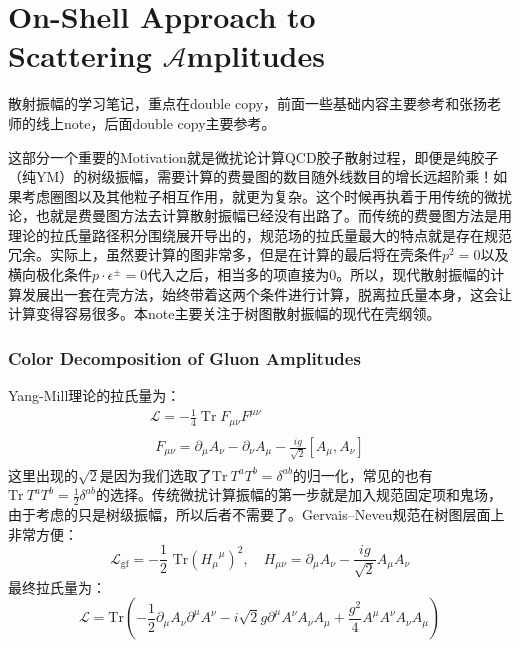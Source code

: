 \part{On-Shell Approach to \\
	Scattering $\mathcal{A}$mplitudes}
\setcounter{theorem}{0}
\setcounter{definition}{0}
\setcounter{lemma}{0}
\setcounter{sidenote}{1}

散射振幅的学习笔记，重点在double copy，前面一些基础内容主要参考\cite{Elvang:2015rqa}和张扬老师的线上note，后面double copy主要参考\cite{Carrasco:2015iwa,Bern:2019prr,Bern:2022wqg}。

这部分一个重要的Motivation就是微扰论计算QCD胶子散射过程，即便是纯胶子（纯YM）的树级振幅，需要计算的费曼图的数目随外线数目的增长远超阶乘！如果考虑圈图以及其他粒子相互作用，就更为复杂。这个时候再执着于用传统的微扰论，也就是费曼图方法去计算散射振幅已经没有出路了。而传统的费曼图方法是用理论的拉氏量路径积分围绕展开导出的，规范场的拉氏量最大的特点就是存在规范冗余。实际上，虽然要计算的图非常多，但是在计算的最后将在壳条件$p^2=0$以及横向极化条件$p\cdot\epsilon^{\pm}=0$代入之后，相当多的项直接为0。所以，现代散射振幅的计算发展出一套在壳方法，始终带着这两个条件进行计算，脱离拉氏量本身，这会让计算变得容易很多。本note主要关注于树图散射振幅的现代在壳纲领。
\section{Color Decomposition of Gluon Amplitudes}
Yang-Mill理论的拉氏量为：
\begin{equation}
	\begin{aligned}
		\mathcal{L}=-\frac14\operatorname{Tr}F_{\mu\nu}F^{\mu\nu}\\
		\begin{aligned}F_{\mu\nu}=\partial_{\mu}A_{\nu}-\partial_{\nu}A_{\mu}-\frac{ig}{\sqrt{2}}[A_{\mu},A_{\nu}]\end{aligned}
	\end{aligned}
\end{equation}
这里出现的$\sqrt{2}$是因为我们选取了$\mathrm{Tr~}T^aT^b=\delta^{ab}$的归一化，常见的也有$\mathrm{Tr~}T^aT^b=\frac{1}{2}\delta^{ab}$的选择。传统微扰计算振幅的第一步就是加入规范固定项和鬼场，由于考虑的只是树级振幅，所以后者不需要了。Gervais–Neveu规范在树图层面上非常方便：
\begin{equation}
	\mathcal{L}_{\mathrm{gf}}=-\frac12\text{ Tr}({H_{\mu}}^{\mu})^2,\quad H_{\mu\nu}=\partial_{\mu}A_{\nu}-\frac{ig}{\sqrt2}A_{\mu}A_{\nu}
\end{equation}
最终拉氏量为：
\begin{equation}
	\mathcal{L}=\mathrm{Tr}\left(-\frac12\partial_{\mu}A_{\nu}\partial^{\mu}A^{\nu}-i\sqrt{2}g\partial^{\mu}A^{\nu}A_{\nu}A_{\mu}+\frac{g^2}4A^{\mu}A^{\nu}A_{\nu}A_{\mu}\right)
\end{equation}

